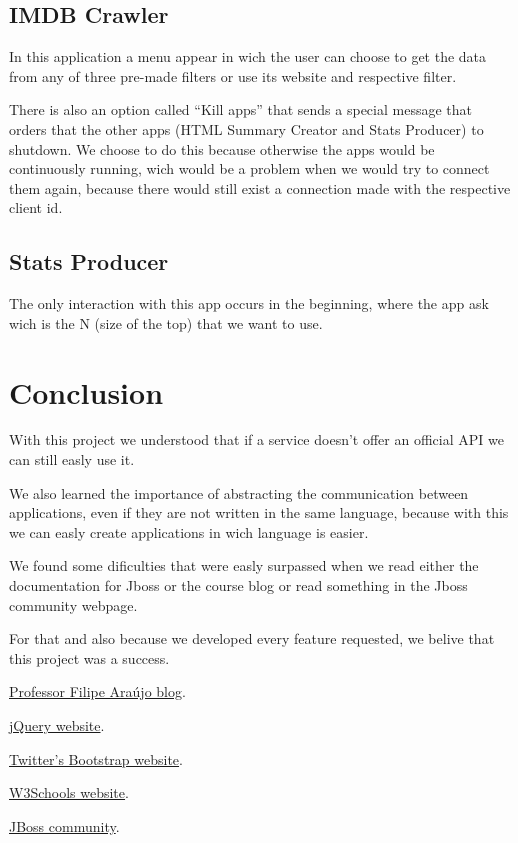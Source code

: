\documentclass[a4paper]{article}
\begin{document}
\subsection{IMDB Crawler}
\indent \indent In this application a menu appear in wich the user can choose to get the data from any of three pre-made filters or use its website and respective filter.

There is also an option called ``Kill apps'' that sends a special message that orders that the other apps (HTML Summary Creator and Stats Producer) to shutdown. We choose to do this because otherwise the apps would be continuously running, wich would be a problem when we would try to connect them again, because there would still exist a connection made with the respective client id.

\subsection{Stats Producer}
\indent \indent The only interaction with this app occurs in the beginning, where the app ask wich is the N (size of the top) that we want to use.

\clearpage
\section{Conclusion}
\indent \indent With this project we understood that if a service doesn't offer an official API we can still easly use it.

We also learned the importance of abstracting the communication between applications, even if they are not written in the same language, because with this we can easly create applications in wich language is easier.

We found some dificulties that were easly surpassed when we read either the documentation for Jboss or the course blog or read something in the Jboss community webpage.

For that and also because we developed every feature requested, we belive that this project was a success.

\clearpage
\begin{thebibliography}{9}
	\href{http://eai-course.blogspot.pt/}{Professor Filipe Araújo blog}.

	\href{http://jquery.com/}{jQuery website}.

	\href{http://getbootstrap.com/}{Twitter's Bootstrap website}.

	\href{http://www.w3schools.com/}{W3Schools website}.
	
	\href{https://community.jboss.org/}{JBoss community}.
\end{thebibliography}
\end{document}
